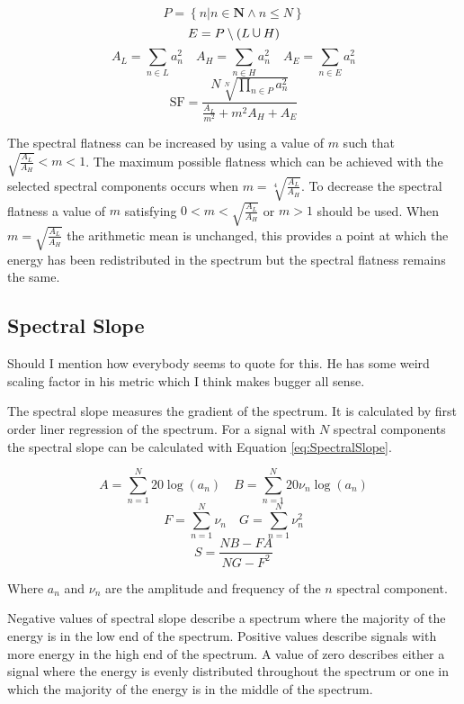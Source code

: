 		\[ P = \left\{ n | n \in \textbf{N} \land n \leq N \right\} \]
		\[ E = P \setminus (L \medcup H) \]
		\[ A_{L} = \sum_{n \in L} a_{n}^{2} \quad A_{H} = \sum_{n \in H} a_{n}^{2}
		   \quad A_{E} = \sum_{n \in E} a_{n}^{2} \]
		\begin{equation}
			\textrm{SF} = \frac{N\sqrt[N]{\prod_{n \in P} a_{n}^{2}}}
			                   {\frac{A_{L}}{m^{2}} + m^{2}A_{H} + A_{E}}
		  	\label{eq:FlatnessManipulation}
		\end{equation}

		The spectral flatness can be increased by using a value of $m$ such that $\sqrt{\frac{A_{L}}{A_{H}}} < m <
		1$. The maximum possible flatness which can be achieved with the selected spectral components occurs when
		$m = \sqrt[4]{\frac{A_{L}}{A_{H}}}$. To decrease the spectral flatness a value of $m$ satisfying $0 <
		m < \sqrt{\frac{A_{L}}{A_{H}}}$ or $m > 1$ should be used. When $m = \sqrt{\frac{A_{L}}{A_{H}}}$ the
		arithmetic mean is unchanged, this provides a point at which the energy has been redistributed in the
		spectrum but the spectral flatness remains the same.

	\subsection{Spectral Slope}
	\label{sec:FeatureControl-Parameterisation-Slope}
		\note
		{
			Should I mention how everybody seems to quote \citet{peeters2004a} for this. He has some weird
			scaling factor in his metric which I think makes bugger all sense.
		}

		The spectral slope measures the gradient of the spectrum. It is calculated by first order liner regression
		of the spectrum. For a signal with $N$ spectral components the spectral slope can be calculated with
		Equation \ref{eq:SpectralSlope}.

		\[ A = \sum_{n = 1}^{N} 20\log (a_{n}) \quad B = \sum_{n = 1}^{N} 20\nu_{n}\log (a_{n}) \]
		\[ F = \sum_{n = 1}^{N} \nu_{n} \quad G = \sum_{n = 1}^{N} \nu_{n}^{2} \]
		\begin{equation}
			S = \frac{NB - FA}
		                 {NG - F^{2}}
			\label{eq:SpectralSlope}
		\end{equation}

		Where $a_{n}$ and $\nu_{n}$ are the amplitude and frequency of the $n$ spectral component.

		Negative values of spectral slope describe a spectrum where the majority of the energy is in the low end of
		the spectrum. Positive values describe signals with more energy in the high end of the spectrum. A value of
		zero describes either a signal where the energy is evenly distributed throughout the spectrum or one in
		which the majority of the energy is in the middle of the spectrum.

